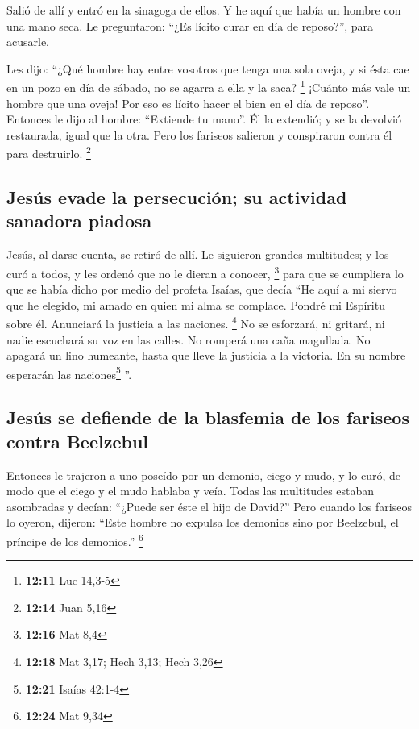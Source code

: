 \begin{paracol}{2}
 Salió de allí y entró en la sinagoga de ellos.
 Y he aquí que había un hombre con una mano seca. Le
preguntaron: ``¿Es lícito curar en día de reposo?'', para acusarle.

 Les dijo: ``¿Qué hombre hay entre vosotros que tenga una
sola oveja, y si ésta cae en un pozo en día de sábado, no se agarra a
ella y la saca? \footnote{\textbf{12:11} Luc 14,3-5} 
¡Cuánto más vale un hombre que una oveja! Por eso es lícito hacer el
bien en el día de reposo''.  Entonces le dijo al hombre:
``Extiende tu mano''. Él la extendió; y se la devolvió restaurada, igual
que la otra.  Pero los fariseos salieron y conspiraron
contra él para destruirlo. \footnote{\textbf{12:14} Juan 5,16}

\hypertarget{jesuxfas-evade-la-persecuciuxf3n-su-actividad-sanadora-piadosa}{%
\subsection{Jesús evade la persecución; su actividad sanadora
piadosa}\label{jesuxfas-evade-la-persecuciuxf3n-su-actividad-sanadora-piadosa}}

 Jesús, al darse cuenta, se retiró de allí. Le siguieron
grandes multitudes; y los curó a todos,  y les ordenó que
no le dieran a conocer, \footnote{\textbf{12:16} Mat 8,4}
 para que se cumpliera lo que se había dicho por medio
del profeta Isaías, que decía  ``He aquí a mi siervo que
he elegido, mi amado en quien mi alma se complace. Pondré mi Espíritu
sobre él. Anunciará la justicia a las naciones. \footnote{\textbf{12:18}
  Mat 3,17; Hech 3,13; Hech 3,26}  No se esforzará, ni
gritará, ni nadie escuchará su voz en las calles.  No
romperá una caña magullada. No apagará un lino humeante, hasta que lleve
la justicia a la victoria.  En su nombre esperarán las
naciones\footnote{\textbf{12:21} Isaías 42:1-4} ''.

\hypertarget{jesuxfas-se-defiende-de-la-blasfemia-de-los-fariseos-contra-beelzebul}{%
\subsection{Jesús se defiende de la blasfemia de los fariseos contra
Beelzebul}\label{jesuxfas-se-defiende-de-la-blasfemia-de-los-fariseos-contra-beelzebul}}

 Entonces le trajeron a uno poseído por un demonio, ciego
y mudo, y lo curó, de modo que el ciego y el mudo hablaba y veía.
 Todas las multitudes estaban asombradas y decían:
``¿Puede ser éste el hijo de David?''  Pero cuando los
fariseos lo oyeron, dijeron: ``Este hombre no expulsa los demonios sino
por Beelzebul, el príncipe de los demonios.'' \footnote{\textbf{12:24}
  Mat 9,34}


\end{paracol}
